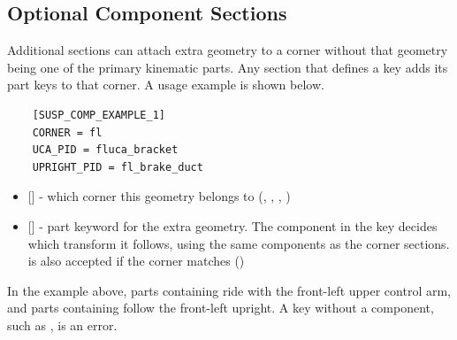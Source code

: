 \subsection{Optional Component Sections}
Additional sections can attach extra geometry to a corner without that geometry being one of the primary kinematic parts. Any section that defines a  key adds its part keys to that corner. A usage example is shown below.
\begin{lstlisting}
    [SUSP_COMP_EXAMPLE_1]
    CORNER = fl
    UCA_PID = fluca_bracket
    UPRIGHT_PID = fl_brake_duct
\end{lstlisting}
\begin{itemize}
    \item {} [] - which corner this geometry belongs to (, , , )

    \item {} [] - part keyword for the extra geometry. The component in the key decides which transform it follows, using the same components as the corner sections.  is also accepted if the corner matches  ()
\end{itemize}
In the example above, parts containing  ride with the front-left upper control arm, and parts containing  follow the front-left upright. A key without a component, such as , is an error.

